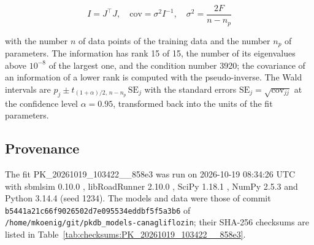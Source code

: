 \begin{equation}
I = J^\top J, \quad \mathrm{cov} = \sigma^2 I^{-1}, \quad \sigma^2 = \frac{2 F}{n - n_p}
\end{equation}

with the number $n$ of data points of the training data and the number $n_p$ of parameters. The information has rank 15 of 15, the number of its eigenvalues above $10^{-8}$ of the largest one, and the condition number 3920; the covariance of an information of a lower rank is computed with the pseudo-inverse. The Wald intervals are $\hat{p}_j \pm t_{(1+\alpha)/2,\, n-n_p}\, \mathrm{SE}_j$ with the standard errors $\mathrm{SE}_j = \sqrt{\mathrm{cov}_{jj}}$ at the confidence level $\alpha = 0.95$, transformed back into the units of the fit parameters.

\subsection{Provenance}

The fit PK\_20261019\_103422\_\_858e3 was run on 2026-10-19 08:34:26 UTC with sbmlsim 0.10.0 \cite{Koenig2026_sbmlsim}, libRoadRunner 2.10.0 \cite{Welsh2023}, SciPy 1.18.1 \cite{Virtanen2020}, NumPy 2.5.3 \cite{Harris2020} and Python 3.14.4 (seed 1234). The models and data were those of commit \texttt{b5441a21c66f9026502d7e095534eddbf5f5a3b6} of \texttt{/home/mkoenig/git/pkdb\_models-canagliflozin}; their SHA-256 checksums are listed in Table~\ref{tab:checksums:PK_20261019_103422__858e3}.

